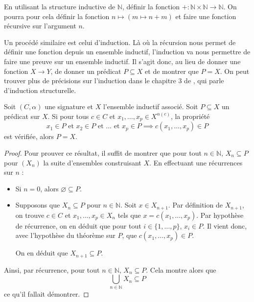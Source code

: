 \begin{exercise}
  En utilisant la structure inductive de $\mathbb N$, définir la fonction
  $+ : \mathbb N \times \mathbb N \to \mathbb N$. On pourra pour cela définir
  la fonction $n \mapsto (m \mapsto n + m)$ et faire une fonction récursive sur
  l'argument $n$.
\end{exercise}

Un procédé similaire est celui d'induction. Là où la récursion nous permet de
définir une fonction depuis un ensemble inductif, l'induction va nous permettre
de faire une preuve sur un ensemble inductif. Il s'agit donc, au lieu de donner
une fonction $X \to Y$, de donner un prédicat $P \subseteq X$ et de montrer que
$P = X$. On peut trouver plus de précisions sur l'induction dans le chapitre $3$
de \cite{winskell1996formal}, qui parle d'induction structurelle.

\begin{theorem}
  Soit $(C,\alpha)$ une signature et $X$ l'ensemble inductif associé. Soit
  $P\subseteq X$ un prédicat sur $X$. Si pour tous $c\in C$ et
  $x_1,\ldots,x_p\in X^{\alpha(c)}$, la propriété
  \[x_1\in P \text{ et } x_2\in P \text{ et }\ldots \text{ et }x_p\in P \implies
  c(x_1,\ldots,x_p)\in P\] est vérifiée,
  alors $P = X$.
\end{theorem}

\begin{proof}
  Pour prouver ce résultat, il suffit de montrer que pour tout $n\in\mathbb N$,
  $X_n \subseteq P$ pour $(X_n)$ la suite d'ensembles construisant $X$. En
  effectuant une récurrences sur $n$ :
  \begin{itemize}
  \item Si $n = 0$, alors $\varnothing \subseteq P$.
  \item Supposons que $X_n \subseteq P$ pour $n \in \mathbb N$. Soit
    $x \in X_{n+1}$. Par définition de $X_{n+1}$, on trouve $c \in C$ et
    $x_1,\ldots,x_p \in X_n$ tels que $x = c(x_1,\ldots,x_p)$. Par hypothèse
    de récurrence, on en déduit que pour tout $i\in\{1,\ldots,p\}$, $x_i\in P$.
    Il vient donc, avec l'hypothèse du théorème sur $P$, que
    $c(x_1,\ldots,x_p)\in P$.

    On en déduit que $X_{n+1}\subseteq P$.
  \end{itemize}

  Ainsi, par récurrence, pour tout $n\in \mathbb N$, $X_n \subseteq P$.
  Cela montre alors que
  \[\bigcup_{n \in \mathbb N} X_n \subseteq P\]
  ce qu'il fallait démontrer.
\end{proof}

